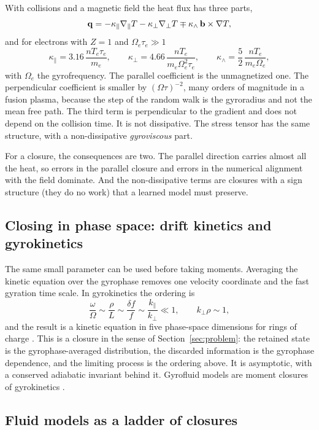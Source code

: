 With collisions and a magnetic field the heat flux has three parts,
\begin{equation}
  \mathbf{q}=-\kappa_\parallel\nabla_\parallel T-\kappa_\perp\nabla_\perp T
      \mp\kappa_\wedge\,\mathbf{b}\times\nabla T ,
\end{equation}
and for electrons with $Z=1$ and $\Omega_e\tau_e\gg1$ \cite{Braginskii65}
\[
  \kappa_\parallel=3.16\,\frac{nT_e\tau_e}{m_e},\qquad
  \kappa_\perp=4.66\,\frac{nT_e}{m_e\Omega_e^2\tau_e},\qquad
  \kappa_\wedge=\frac52\,\frac{nT_e}{m_e\Omega_e},
\]
with $\Omega_e$ the gyrofrequency. The parallel coefficient is the
unmagnetized one. The perpendicular coefficient is smaller by
$(\Omega\tau)^{-2}$, many orders of magnitude in a fusion plasma, because
the step of the random walk is the gyroradius and not the mean free path.
The third term is perpendicular to the gradient and does not depend on the
collision time. It is not dissipative. The stress tensor has the same
structure, with a non-dissipative \emph{gyroviscous} part.

For a closure, the consequences are two. The parallel direction carries
almost all the heat, so errors in the parallel closure and errors in the
numerical alignment with the field dominate. And the non-dissipative terms
are closures with a sign structure (they do no work) that a learned model
must preserve.

\subsection{Closing in phase space: drift kinetics and gyrokinetics}

The same small parameter can be used before taking moments. Averaging the
kinetic equation over the gyrophase removes one velocity coordinate and the
fast gyration time scale. In gyrokinetics the ordering is
\[
  \frac{\omega}{\Omega}\sim\frac{\rho}{L}\sim\frac{\delta f}{f}
  \sim\frac{k_\parallel}{k_\perp}\ll1,\qquad k_\perp\rho\sim1,
\]
and the result is a kinetic equation in five phase-space dimensions for
rings of charge \cite{BrizardHahm07}. This is a closure in the sense of
Section~\ref{sec:problem}: the retained state is the gyrophase-averaged
distribution, the discarded information is the gyrophase dependence, and
the limiting process is the ordering above. It is asymptotic, with a
conserved adiabatic invariant behind it. Gyrofluid models are moment
closures of gyrokinetics \cite{DorlandHammett93}.

\subsection{Fluid models as a ladder of closures}

